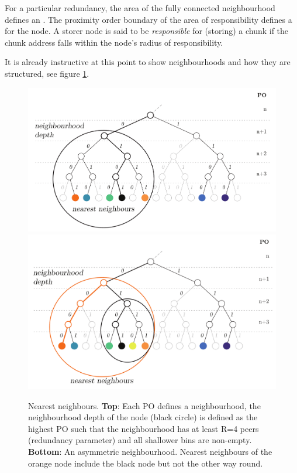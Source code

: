 For a particular redundancy, the area of the fully connected neighbourhood defines an . The proximity order boundary of the area of responsibility defines a  for the node. A storer node is said to be \emph{responsible} for (storing) a chunk if the chunk address falls within the node's radius of responsibility.

It is already instructive at this point to show neighbourhoods and how they are structured, see figure \ref{fig:nearest-neighbours}. 

\begin{figure}[htbp]
   \centering
   \includegraphics[width=\textwidth]{fig/nearest-neighbours-2.pdf}\\
   \includegraphics[width=\textwidth]{fig/asymmetric-nodes2.pdf}
   \caption[Nearest neighbours \statusgreen]{Nearest neighbours. \textbf{Top}: Each PO defines a neighbourhood, the neighbourhood depth of the node (black circle) is defined as the highest PO such that the neighbourhood has at least R=4 peers (redundancy parameter) and all shallower bins are non-empty. \textbf{Bottom}: An asymmetric neighbourhood. Nearest neighbours of the orange node include the black node but not the other way round.}
   \label{fig:nearest-neighbours}
\end{figure}


